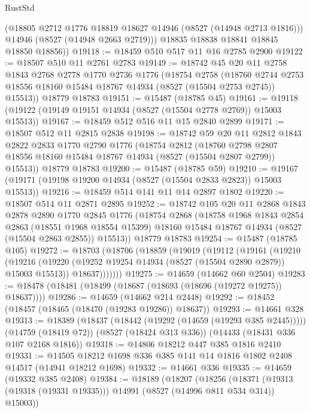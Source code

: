 \begin{lexlean}{RustStd}
\begin{coremodule}
          (@18805 @2712 @1776 @18819 @18627 @14946 (@8527 (@14948 @2713 @1816)))
          @14946
          (@8527 (@14948 @2663 @2719)))
        @18835
        @18838
        @18841
        @18845
        @18850
        @18856))
@19118 := @18459 @510 @517 @11 @16 @2785 @2900
@19122 := @18507 @510 @11 @2761 @2783
@19149 := @18742
    @45
    @20
    @11
    @2758
    @1843
    @2768
    @2778
    @1770
    @2736
    @1776
    (@18754
      @2758
      (@18760 @2744 @2753 @18556 @18160 @15484 @18767 @14934 (@8527 (@15504 @2753 @2745)) @15513))
    @18779
    @18783
@19151 := @15487 (@18785 @45)
@19161 := @19118 (@19122 (@19149 @19151 @14934 (@8527 (@15504 @2778 @2769)) @15003 @15513))
@19167 := @18459 @512 @516 @11 @15 @2840 @2899
@19171 := @18507 @512 @11 @2815 @2838
@19198 := @18742
    @59
    @20
    @11
    @2812
    @1843
    @2822
    @2833
    @1770
    @2790
    @1776
    (@18754
      @2812
      (@18760 @2798 @2807 @18556 @18160 @15484 @18767 @14934 (@8527 (@15504 @2807 @2799)) @15513))
    @18779
    @18783
@19200 := @15487 (@18785 @59)
@19210 := @19167 (@19171 (@19198 @19200 @14934 (@8527 (@15504 @2833 @2823)) @15003 @15513))
@19216 := @18459 @514 @141 @11 @14 @2897 @1802
@19220 := @18507 @514 @11 @2871 @2895
@19252 := @18742
    @105
    @20
    @11
    @2868
    @1843
    @2878
    @2890
    @1770
    @2845
    @1776
    (@18754
      @2868
      (@18758
        @1968
        @1843
        @2854
        @2863
        (@18551 @1968 @18554 @15399)
        @18160
        @15484
        @18767
        @14934
        (@8527 (@15504 @2863 @2855))
        @15513))
    @18779
    @18783
@19254 := @15487 (@18785 @105)
@19272 := @18703
    (@18706
      (@18859
        (@19019
          (@19112
            (@19161
              (@19210
                (@19216
                  (@19220 (@19252 @19254 @14934 (@8527 (@15504 @2890 @2879)) @15003 @15513))
                  @18637)))))))
@19275 := @14659 (@14662 @60 @2504)
@19283 := @18478 (@18481 (@18499 (@18687 (@18693 (@18696 (@19272 @19275)) @18637))))
@19286 := @14659 (@14662 @214 @2448)
@19292 := @18452 (@18457 (@18465 (@18470 (@19283 @19286)) @18637))
@19293 := @14661 @328
@19313 := @18389
    (@18437 (@18442 (@19292 (@14659 (@19293 @385 @2445)))))
    (@14759 (@18419 @72))
    (@8527 (@18424 @313 @336))
    (@14433 (@18431 @336 @107 @2168 @1816))
@19318 := @14806 @18212 @447 @385 @1816 @2410
@19331 := @14505 @18212 @1698 @336 @385 @141 @14 @1816 @1802 @2408 @14517 (@14941 @18212 @1698)
@19332 := @14661 @336
@19335 := @14659 (@19332 @385 @2408)
@19384 := @18189
    (@18207
      (@18256
        (@18371 (@19313 (@19318 (@19331 @19335))) @14991 (@8527 (@14996 @811 @534 @314)) @15003))

\end{coremodule}
\end{lexlean}
